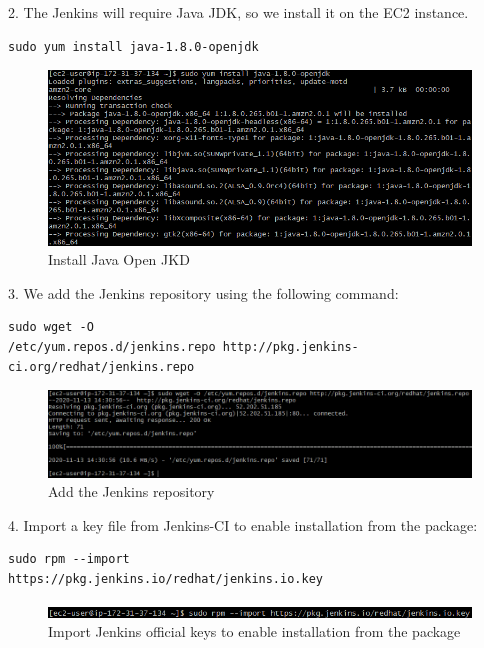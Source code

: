 \documentclass[12pt,a4paper,twoside]{article}
\begin{document}
2. The Jenkins will require Java JDK, so we install it on the EC2 instance.


\begin{verbatim}
sudo yum install java-1.8.0-openjdk
\end{verbatim}


\begin{figure}[H]
    \centering
        \includegraphics[width=15cm]{images-aws/15-install-java.png}
        \caption{Install Java Open JKD}
\end{figure}


3. We add the Jenkins repository using the following command:


\begin{verbatim}
sudo wget -O
/etc/yum.repos.d/jenkins.repo http://pkg.jenkins-
ci.org/redhat/jenkins.repo
\end{verbatim}


\begin{figure}[H]
    \centering
        \includegraphics[width=15cm]{images-aws/16-download-jenkins.png}
        \caption{Add the Jenkins repository}
\end{figure}


4. Import a key file from Jenkins-CI to enable installation from the package:


\begin{verbatim}
sudo rpm --import
https://pkg.jenkins.io/redhat/jenkins.io.key
\end{verbatim}


\begin{figure}[H]
    \centering
        \includegraphics[width=15cm]{images-aws/17-import-jenkins-keys.png}
        \caption{Import Jenkins official keys to enable installation from the package}
\end{figure}
\end{document}
